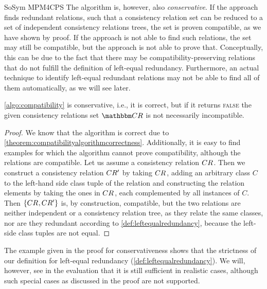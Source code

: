 \begin{copiedFrom}{SoSym MPM4CPS}
The algorithm is, however, also \emph{conservative}.
If the approach finds redundant relations, such that a consistency relation set can be reduced to a set of independent consistency relations trees, the set is proven compatible, as we have shown by proof.
If the approach is not able to find such relations, the set may still be compatible, but the approach is not able to prove that.
Conceptually, this can be due to the fact that there may be compatibility-preserving relations that do not fulfill the definition of left-equal redundancy.
Furthermore, an actual technique to identify left-equal redundant relations may not be able to find all of them automatically, as we will see later.

\begin{theorem}
    \autoref{algo:compatibility} is conservative, i.e., it is correct, but if it returns \textsc{false} the given consistency relations set $\consistencyrelationset{CR}$ is not necessarily incompatible.
\end{theorem}

\begin{proof}
    We know that the algorithm is correct due to \autoref{theorem:compatibilityalgorithmcorrectness}.
    Additionally, it is easy to find examples for which the algorithm cannot prove compatibility, although the relations are compatible.
    Let us assume a consistency relation $CR_{}$. 
    Then we construct a consistency relation $CR_{}'$ by taking $CR_{}$, adding an arbitrary class $C$ to the left-hand side class tuple of the relation and constructing the relation elements by taking the ones in $CR_{}$, each complemented by all instances of $C$.
    Then $\{ CR_{},CR_{}' \}$ is, by construction, compatible, but the two relations are neither independent or a consistency relation tree, as they relate the same classes, nor are they redundant according to \autoref{def:leftequalredundancy}, because the left-side class tuples are not equal.
\end{proof}

The example given in the proof for conservativeness shows that the strictness of our definition for left-equal redundancy (\autoref{def:leftequalredundancy}).
We will, however, see in the evaluation that it is still sufficient in realistic cases, although such special cases as discussed in the proof are not supported.


\end{copiedFrom}
